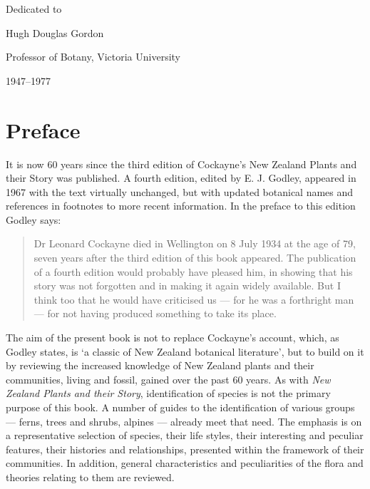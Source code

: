 \markboth{}{}

{
    \thispagestyle{empty}
    \hspace{0pt}
    \vfill
    \begin{center}
        Dedicated to\par
        Hugh Douglas Gordon\par
        Professor of Botany, Victoria University\par
        1947–1977
    \end{center}
    \vfill
    \vfill
}

\chapter*{Preface}

It is now 60 years since the third edition of Cockayne's New Zealand Plants and their Story was published.
A fourth edition, edited by E. J. Godley, appeared in 1967 with the text virtually unchanged, but with updated botanical names and references in footnotes to more recent information.
In the preface to this edition Godley says:

\begin{quote}
    Dr Leonard Cockayne died in Wellington on 8 July 1934 at the age of 79, seven years after the third edition of this book appeared.
    The publication of a fourth edition would probably have pleased him, in showing that his story was not forgotten and in making it again widely available.
    But I think too that he would have criticised us --- for he was a forthright man --- for not having produced something to take its place.
\end{quote}

The aim of the present book is not to replace Cockayne's account, which, as Godley states, is `a classic of New Zealand botanical literature', but to build on it by reviewing the increased knowledge of New Zealand plants and their communities, living and fossil, gained over the past 60 years.
As with \emph{New Zealand Plants and their Story}, identification of species is not the primary purpose of this book.
A number of guides to the identification of various groups --- ferns, trees and shrubs, alpines --- already meet that need.
The emphasis is on a representative selection of species, their life styles, their interesting and peculiar features, their histories and relationships, presented within the framework of their communities.
In addition, general characteristics and peculiarities of the flora and theories relating to them are reviewed.

